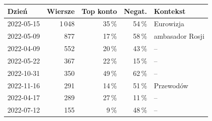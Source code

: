 \begin{tabular}{@{}lrrrl@{}}
\toprule
Dzień & Wiersze & Top konto & Negat. & Kontekst \\
\midrule
2022-05-15 & 1\,048 & 35\,\% & 54\,\% & Eurowizja \\
2022-05-09 & 877 & 17\,\% & 58\,\% & ambasador Rosji \\
2022-04-09 & 552 & 20\,\% & 43\,\% & -- \\
2022-05-22 & 367 & 22\,\% & 15\,\% & -- \\
2022-10-31 & 350 & 49\,\% & 62\,\% & -- \\
2022-11-16 & 291 & 14\,\% & 51\,\% & Przewodów \\
2022-04-17 & 289 & 27\,\% & 11\,\% & -- \\
2022-07-12 & 155 & 9\,\% & 48\,\% & -- \\
\bottomrule
\end{tabular}
